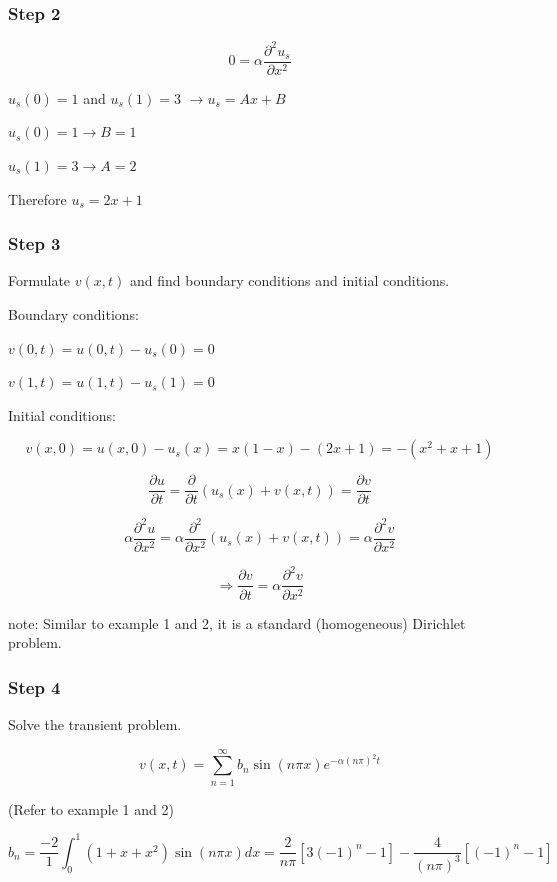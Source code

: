 \documentclass{article}
\begin{document}
\subsubsection{Step 2}

$$0 = \alpha \frac{\partial^2 u_s}{\partial x^2}$$

$u_s(0) = 1$ and $u_s(1) = 3$ $\rightarrow u_s = A x + B$

$u_s(0) = 1 \rightarrow B = 1$

$u_s(1) = 3 \rightarrow A = 2$

Therefore $u_s = 2 x + 1$

\subsubsection{Step 3}

Formulate $v(x,t)$ and find boundary conditions and initial conditions. 

Boundary conditions:

$v(0,t) = u(0,t) - u_s(0) = 0$

$v(1,t) = u(1,t) - u_s(1) = 0$

Initial conditions:

$$v(x,0) = u(x,0) - u_s(x) = x(1-x) - (2x+1) = -(x^2 + x + 1)$$

$$\frac{\partial u}{\partial t} = \frac{\partial}{\partial t} \left( u_s (x) + v(x,t) \right) = \frac{\partial v}{\partial t}$$

$$\alpha \frac{\partial^2 u}{\partial x^2} = \alpha \frac{\partial^2}{\partial x^2} \left( u_s (x) + v(x,t) \right) = \alpha \frac{\partial^2 v}{\partial x^2}$$

$$\Rightarrow \frac{\partial v}{\partial t} = \alpha \frac{\partial^2 v}{\partial x^2}$$

note: Similar to example 1 and 2, it is a standard (homogeneous) Dirichlet problem. 

\subsubsection{Step 4}

Solve the transient problem. 

$$v(x,t) = \sum_{n = 1}^\infty b_n \sin(n \pi x) e^{-\alpha (n \pi)^2 t}$$

(Refer to example 1 and 2)

$$b_n = \frac{-2}{1} \int_0^1 (1 + x + x^2) \sin(n \pi x) dx = \frac{2}{n \pi} \left[ 3(-1)^n - 1 \right] - \frac{4}{(n \pi)^3} \left[(-1)^n - 1 \right]$$
\end{document}
